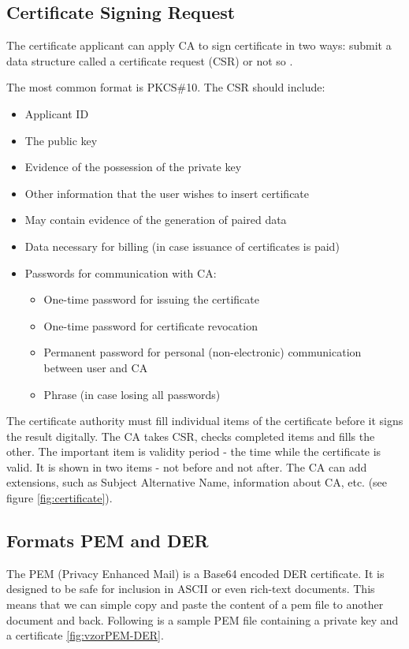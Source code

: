 \documentclass[
  digital, %
  notable,   %
  lof,     %
  lot,     %
]{fithesis3}
\begin{document}
\subsection{Certificate Signing Request}
The certificate applicant can apply CA to sign certificate in two ways: submit a data structure 
called a certificate request (CSR) or not so \cite{dostalek2016velky}. 

The most common format is PKCS\#10. The CSR should include:
\begin{itemize}[leftmargin=2em,rightmargin=1em,itemsep=0.75\parskip,parsep=0em,topsep=0em,partopsep=0em]
\item Applicant ID
\item The public key
\item Evidence of the possession of the private key
\item Other information that the user wishes to insert certificate
\item May contain evidence of the generation of paired data
\item Data necessary for billing (in case issuance of certificates is paid)
\item Passwords for communication with CA:
  \begin{itemize}[leftmargin=2em,rightmargin=1em,itemsep=0.75\parskip,parsep=0em,topsep=0em,partopsep=0em]
  \item One-time password for issuing the certificate
  \item One-time password for certificate revocation
  \item Permanent password for personal (non-electronic) communication between user and CA
  \item Phrase (in case losing all passwords) 
  \end{itemize}
\end{itemize} 

The certificate authority must fill individual items of the certificate before it signs 
the result digitally. The CA takes CSR, checks completed items and fills the other. The important item is validity period - the time while the certificate is valid. It is shown in two items - not before and not after. The CA can add extensions, such as Subject Alternative Name, information about CA, etc. (see figure \ref{fig:certificate}).

\subsection{Formats PEM and DER}
The PEM (Privacy Enhanced Mail) is a Base64 encoded DER certificate. It is designed 
to be safe for inclusion in ASCII or even rich-text documents. This means that we can simple 
copy and paste the content of a pem file to another document and back. Following is a sample 
PEM file containing a private key and a certificate \ref{fig:vzorPEM-DER}.
\end{document}
